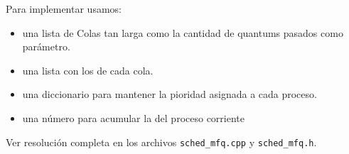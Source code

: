 Para implementar \mfq usamos:

\begin{itemize}
 \item una lista de Colas tan larga como la cantidad de quantums pasados como par\'ametro.
 \item una lista con los \quantums de cada cola.
 \item una diccionario para mantener la pioridad asignada a cada proceso.
 \item una n\'umero para acumular la \quota del proceso corriente
\end{itemize}

Ver resoluci\'on completa en los archivos \verb|sched_mfq.cpp| y \verb|sched_mfq.h|.
